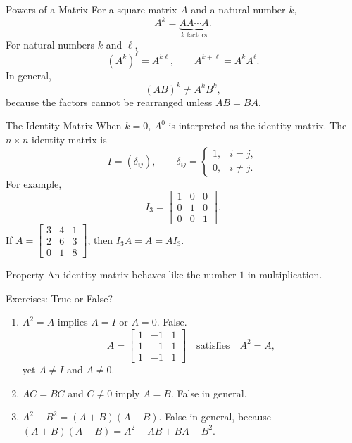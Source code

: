 \begin{frame}{Powers of a Matrix}
For a square matrix $A$ and a natural number $k$,
\[
A^k=\underbrace{AA\cdots A}_{k\text{ factors}}.
\]
For natural numbers $k$ and $\ell$,
\[
(A^k)^\ell=A^{k\ell},\qquad
A^{k+\ell}=A^kA^\ell.
\]
In general,
\[
(AB)^k\ne A^kB^k,
\]
because the factors cannot be rearranged unless $AB=BA$.
\end{frame}

\begin{frame}[shrink=4]{The Identity Matrix}
When $k=0$, $A^0$ is interpreted as the identity matrix. The $n\times n$ identity matrix is
\[
I=(\delta_{ij}),\qquad
\delta_{ij}=\begin{cases}1,&i=j,\\0,&i\ne j.\end{cases}
\]
For example,
\[
I_3=\begin{bmatrix}1&0&0\\0&1&0\\0&0&1\end{bmatrix}.
\]
If $A=\begin{bmatrix}3&4&1\\2&6&3\\0&1&8\end{bmatrix}$, then $I_3A=A=AI_3$.
\begin{block}{Property}
An identity matrix behaves like the number $1$ in multiplication.
\end{block}
\end{frame}

\begin{frame}[shrink=6]{Exercises: True or False?}
\begin{enumerate}
  \item $A^2=A$ implies $A=I$ or $A=0$. \alert{False.}
  \[
  A=\begin{bmatrix}1&-1&1\\1&-1&1\\1&-1&1\end{bmatrix}
  \quad\text{satisfies}\quad A^2=A,
  \]
  yet $A\ne I$ and $A\ne0$.
  \item $AC=BC$ and $C\ne0$ imply $A=B$. \alert{False in general.}
  \item $A^2-B^2=(A+B)(A-B)$. \alert{False in general,} because
  $(A+B)(A-B)=A^2-AB+BA-B^2$.
\end{enumerate}
\end{frame}

